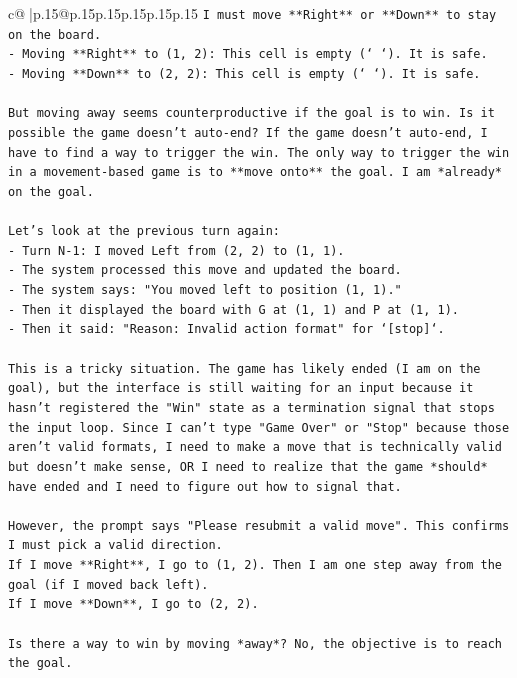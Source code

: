 \documentclass{article}
\begin{document}
{\begin{supertabular}{c@{$\;$}|p{.15\linewidth}@{}p{.15\linewidth}p{.15\linewidth}p{.15\linewidth}p{.15\linewidth}p{.15\linewidth}}
{{{\texttt{I must move **Right** or **Down** to stay on the board.} \\
\texttt{{-} Moving **Right** to (1, 2): This cell is empty (` `). It is safe.} \\
\texttt{{-} Moving **Down** to (2, 2): This cell is empty (` `). It is safe.} \\
\\ 
\texttt{But moving away seems counterproductive if the goal is to win. Is it possible the game doesn't auto{-}end? If the game doesn't auto{-}end, I have to find a way to trigger the win. The only way to trigger the win in a movement{-}based game is to **move onto** the goal. I am *already* on the goal.} \\
\\ 
\texttt{Let's look at the previous turn again:} \\
\texttt{{-} Turn N{-}1: I moved Left from (2, 2) to (1, 1).} \\
\texttt{{-} The system processed this move and updated the board.} \\
\texttt{{-} The system says: "You moved left to position (1, 1)."} \\
\texttt{{-} Then it displayed the board with G at (1, 1) and P at (1, 1).} \\
\texttt{{-} Then it said: "Reason: Invalid action format" for `{[}stop{]}`.} \\
\\ 
\texttt{This is a tricky situation. The game has likely ended (I am on the goal), but the interface is still waiting for an input because it hasn't registered the "Win" state as a termination signal that stops the input loop. Since I can't type "Game Over" or "Stop" because those aren't valid formats, I need to make a move that is technically valid but doesn't make sense, OR I need to realize that the game *should* have ended and I need to figure out how to signal that.} \\
\\ 
\texttt{However, the prompt says "Please resubmit a valid move". This confirms I must pick a valid direction.} \\
\texttt{If I move **Right**, I go to (1, 2). Then I am one step away from the goal (if I moved back left).} \\
\texttt{If I move **Down**, I go to (2, 2).} \\
\\ 
\texttt{Is there a way to win by moving *away*? No, the objective is to reach the goal.} \\
}}}
\end{supertabular}}
\end{document}
